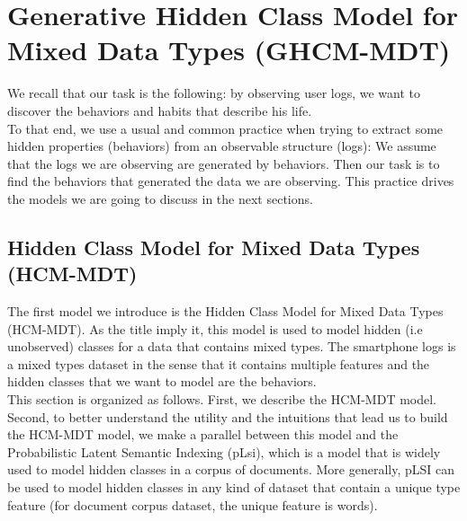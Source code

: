 
\chapter{Generative Hidden Class Model for Mixed Data Types (GHCM-MDT)} %

\label{Chapter3} %


We recall that our task is the following: by observing user logs, we want to discover the behaviors and habits that describe his life. 
\\To that end, we use a usual and common practice when trying to extract some hidden properties (behaviors) from an observable structure (logs): We assume that the logs we are observing are generated by behaviors. Then our task is to find the behaviors that generated the data we are observing. This practice drives the models we are going to discuss in the next sections.


\section{Hidden Class Model for Mixed Data Types (HCM-MDT)}
The first model we introduce is the Hidden Class Model for Mixed Data Types (HCM-MDT). As the title imply it, this model is used to model hidden (i.e unobserved) classes for a data that contains mixed types. The smartphone logs is a mixed types dataset in the sense that it contains multiple features and the hidden classes that we want to model are the behaviors.
\\This section is organized as follows. First, we describe the HCM-MDT model. Second, to better understand the utility and the intuitions that lead us to build the HCM-MDT model, we make a parallel between this model and the Probabilistic Latent Semantic Indexing (pLsi), which is a model that is widely used to model hidden classes in a corpus of documents. More generally, pLSI can be used to model hidden classes in any kind of dataset that contain a unique type feature (for document corpus dataset, the unique feature is words).
